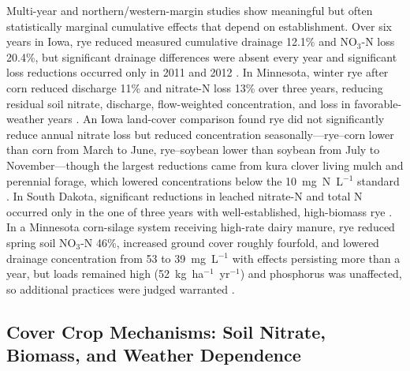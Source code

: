 Multi-year and northern/western-margin studies show meaningful but often statistically marginal cumulative effects that depend on establishment. Over six years in Iowa, rye reduced measured cumulative drainage 12.1\% and NO$_3$-N loss 20.4\%, but significant drainage differences were absent every year and significant loss reductions occurred only in 2011 and 2012 \parencite{MartinezFeria2016}. In Minnesota, winter rye after corn reduced discharge 11\% and nitrate-N loss 13\% over three years, reducing residual soil nitrate, discharge, flow-weighted concentration, and loss in favorable-weather years \parencite{Strock2004}. An Iowa land-cover comparison found rye did not significantly reduce annual nitrate loss but reduced concentration seasonally---rye--corn lower than corn from March to June, rye--soybean lower than soybean from July to November---though the largest reductions came from kura clover living mulch and perennial forage, which lowered concentrations below the 10~mg~N~L$^{-1}$ standard \parencite{Qi2011b}. In South Dakota, significant reductions in leached nitrate-N and total N occurred only in the one of three years with well-established, high-biomass rye \parencite{Bawa2023}. In a Minnesota corn-silage system receiving high-rate dairy manure, rye reduced spring soil NO$_3$-N 46\%, increased ground cover roughly fourfold, and lowered drainage concentration from 53 to 39~mg~L$^{-1}$ with effects persisting more than a year, but loads remained high (52~kg~ha$^{-1}$~yr$^{-1}$) and phosphorus was unaffected, so additional practices were judged warranted \parencite{Krueger2013}.

\subsection{Cover Crop Mechanisms: Soil Nitrate, Biomass, and Weather Dependence}

